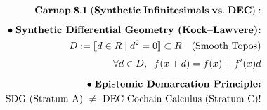 \documentclass[preview]{standalone}
\begin{document}
\begin{align*}
\special{dvisvgm:raw <g id='unique000'>}\mathbf{Carnap\;8.1\;(Synthetic\;Infinitesimals\;vs.\;DEC):}\\[5pt]\bullet\;\textbf{Synthetic Differential Geometry (Kock--Lawvere):}\\\;\;D := [\![d\in R \mid d^2 = 0]\!]\subset R\quad(\text{Smooth Topos})\\[3pt]\;\;\forall d\in D,\;\; f(x+d) = f(x) + f'(x)d\\[6pt]\bullet\;\textbf{Epistemic Demarcation Principle:}\\\;\;\text{SDG (Stratum A) }\neq\text{ DEC Cochain Calculus (Stratum C)}!\special{dvisvgm:raw </g>}
\end{align*}
\end{document}
